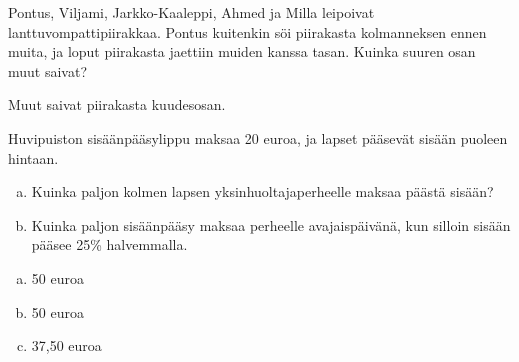    
    \begin{tehtava} %
        Pontus, Viljami, Jarkko-Kaaleppi, Ahmed ja Milla leipoivat lanttuvompattipiirakkaa.
        Pontus kuitenkin söi piirakasta kolmanneksen ennen muita, ja loput piirakasta
        jaettiin muiden kanssa tasan. Kuinka suuren osan muut saivat?
        
        \begin{vastaus}
            Muut saivat piirakasta kuudesosan.
        \end{vastaus}
    \end{tehtava}
    
    \begin{tehtava} %
        Huvipuiston sisäänpääsylippu maksaa 20 euroa, ja lapset pääsevät
        sisään puoleen hintaan.
	\begin{enumerate}[a)]
		\item Kuinka paljon kolmen lapsen yksinhuoltajaperheelle maksaa päästä sisään?
		\item Kuinka paljon sisäänpääsy maksaa perheelle avajaispäivänä,
		kun silloin sisään pääsee 25\% halvemmalla.
        \end{enumerate}
        \begin{vastaus}
	\begin {enumerate}[a)]
         \item 50 euroa 
           \item 50 euroa 
	\item 37,50 euroa
\end{enumerate} 
       \end{vastaus}
    \end{tehtava}
    
